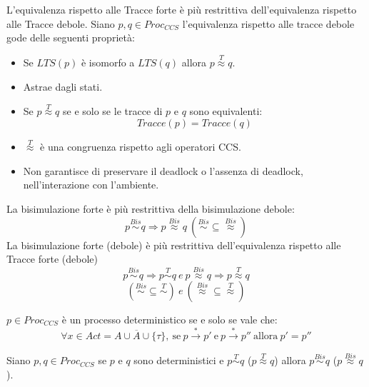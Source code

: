 L'equivalenza rispetto alle Tracce forte è più restrittiva dell'equivalenza rispetto alle Tracce debole. Siano $p, q \in Proc_{CCS}$ l'equivalenza rispetto alle tracce debole gode delle seguenti proprietà:
\begin{itemize}
    \item Se $LTS(p)$ è isomorfo a $LTS(q)$ allora $p \stackrel{T}{\approx} q$.
    \item Astrae dagli stati.
    \item Se $p \stackrel{T}{\approx} q$ se e solo se le tracce di $p$ e $q$ sono equivalenti: $$Tracce(p) = Tracce(q)$$
    \item $\stackrel{T}{\approx}$ è una congruenza rispetto agli operatori CCS.
    \item Non garantisce di preservare il deadlock o l'assenza di deadlock, nell'interazione con l'ambiente.
\end{itemize}
La bisimulazione forte è più restrittiva della bisimulazione debole: $$p \stackrel{Bis}{\sim} q \Rightarrow p \stackrel{Bis}{\approx} q \ ( \stackrel{Bis}{\sim} \subseteq \stackrel{Bis}{\approx})$$ La bisimulazione forte (debole) è più restrittiva dell'equivalenza rispetto alle Tracce forte (debole) $$p \stackrel{Bis}{\sim} q \Rightarrow p \stackrel{T}{\sim} q \ e \ p \stackrel{Bis}{\approx} q \Rightarrow p \stackrel{T}{\approx} q$$ $$(\stackrel{Bis}{\sim} \subseteq \stackrel{T}{\sim}) \ e \ (\stackrel{Bis}{\approx} \subseteq \stackrel{T}{\approx})$$
\begin{definizione}
    $p \in Proc_{CCS}$ è un processo deterministico se e solo se vale che: $$\forall x \in Act = A \cup \overline{A} \cup \{\tau\}, \ \text{se} \ p \xrightarrow{\ast} p' \ \text{e} \ p \xrightarrow{\ast} p'' \ \text{allora} \ p' = p''$$
\end{definizione}
Siano $p, q \in Proc_{CCS}$ se $p$ e $q$ sono deterministici e $p \stackrel{T}{\sim} q$ ($p \stackrel{T}{\approx} q$) allora $p \stackrel{Bis}{\sim} q$ ($p \stackrel{Bis}{\approx} q$).

